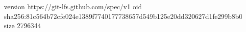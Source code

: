 version https://git-lfs.github.com/spec/v1
oid sha256:81c564b72cfe024e1389f7740177738657d549b125e20dd320627d1fe299b8b0
size 2796344

